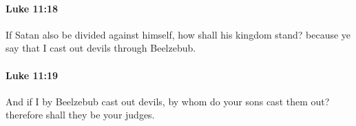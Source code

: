 		\paragraph{Luke 11:18} %
			\label{LUKE-11-18}

			If Satan also be divided against himself, how shall his kingdom stand? because ye say that I cast out devils through Beelzebub.

			\begin{framed}
			\scriptsize
				\begin{compactdesc}
					\item[SBLG] 
				\end{compactdesc}
			\end{framed}

		\paragraph{Luke 11:19} %
			\label{LUKE-11-19}

			And if I by Beelzebub cast out devils, by whom do your sons cast them out? therefore shall they be your judges.

